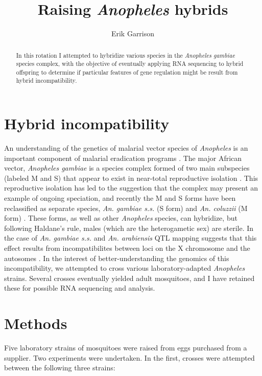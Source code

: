 \documentclass{article}
\begin{document}
\title{Raising \emph{Anopheles} hybrids}

\author{Erik Garrison}

\maketitle

\begin{abstract}
In this rotation I attempted to hybridize various species in the \emph{Anopheles gambiae} species complex, with the objective of eventually applying RNA sequencing to hybrid offspring to determine if particular features of gene regulation might be result from hybrid incompatibility.
\end{abstract}


\section{Hybrid incompatibility}

An understanding of the genetics of malarial vector species of \emph{Anopheles} is an important component of malarial eradication programs \cite{pmid25554792}. The major African vector, \emph{Anopheles gambiae} is a species complex formed of two main subspecies (labeled M and S) that appear to exist in near-total reproductive isolation  \cite{lanzaro2013speciation}.
This reproductive isolation has led to the suggestion that the complex may present an example of ongoing speciation, and recently the M and S forms have been reclassified as separate species, \emph{An. gambiae s.s.} (S form) and \emph{An. coluzzii} (M form) \cite{pmid26131476}.
These forms, as well as other \emph{Anopheles} species, can hybridize, but following Haldane's rule, males (which are the heterogametic sex) are sterile. In the case of \emph{An. gambiae s.s.} and \emph{An. arabiensis} QTL mapping suggests that this effect results from incompatibilites between loci on the X chromosome and the autosomes \cite{slotman2004genetics}.
In the interest of better-understanding the genomics of this incompatibility, we attempted to cross various laboratory-adapted \emph{Anopheles} strains. Several crosses eventually yielded adult mosquitoes, and I have retained these for possible RNA sequencing and analysis.

\section{Methods}

Five laboratory strains of mosquitoes were raised from eggs purchased from a supplier. Two experiments were undertaken. In the first, crosses were attempted between the following three strains:
\end{document}
